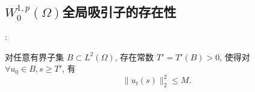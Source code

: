 \documentclass[UTF8]{ctexbeamer}
\newcommand*\abs[1]{\lvert#1\rvert}
\newcommand*\norm[1]{\lVert#1\rVert}
\begin{document}
\subsection{\texorpdfstring{$W_0^{1,p}(\Omega)$}上全局吸引子的存在性}
\begin{frame}{\secname : \subsecname}

    \begin{theorem}\label{thm:ut_L2_bd}
        对任意有界子集 $B \subset L^2(\Omega)$,
        存在常数 $T' = T'(B) > 0$, 使得对 $\forall u_0 \in B, s \geq T'$, 有
        \begin{equation*}
            \norm{u_t(s)}_2^2 \leq M.
        \end{equation*}
    \end{theorem}

\end{frame}



\end{document}
